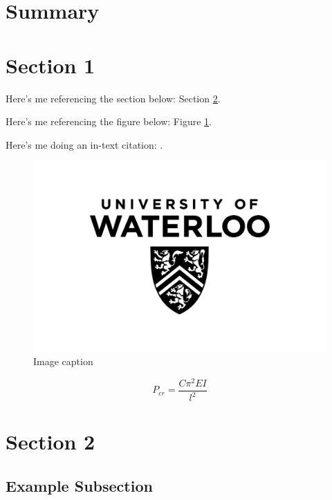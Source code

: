 \documentclass[12pt,letterpaper]{article}
\begin{document}
  
  
  \clearpage
  \tableofcontents{}\setcounter{page}{1}
  \clearpage
  \listoffigures
  \clearpage
  \listoftables
  \clearpage
  \section*{Summary}
  \clearpage
  \section{Section 1}
    Here's me referencing the section below: Section \ref{sec:section2}.

    Here's me referencing the figure below: Figure \ref{fig:figurelabel}.
    
    Here's me doing an in-text citation: \cite{example}.
    \begin{figure}[h!]
      \centering
      \includegraphics[width=0.7\linewidth]{images/uwlogo.jpg} %
      \caption{Image caption}
      \label{fig:figurelabel}
    \end{figure}

    \begin{equation*} %
      P_{cr}=\frac{C\pi^{2}EI}{l^{2}}
    \end{equation*}
    
  \section{Section 2}
    \label{sec:section2}
  \subsection{Example Subsection}
\end{document}
